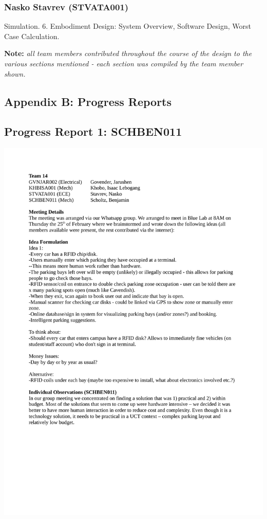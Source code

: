 \subsubsection*{Nasko Stavrev (STVATA001)}
Simulation.
6. Embodiment Design: System Overview, Software Design, Worst Case Calculation.

\vfill
\textbf{Note: }\textit{all team members contributed throughout the course of the design to the various sections mentioned - each section was compiled by the team member shown.}

\newpage
\vspace*{\fill}
\begin{center}
\subsection*{Appendix B: Progress Reports}
\end{center}
\vspace*{\fill}

\newpage
\subsection*{Progress Report 1: SCHBEN011}
\includegraphics[scale=0.9]{meeting/report1-ben.pdf}

